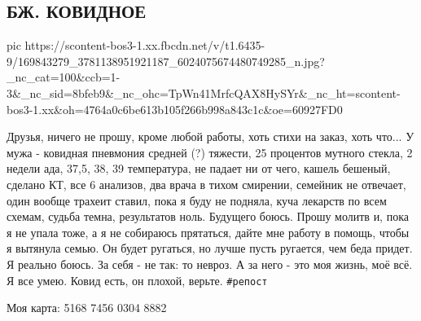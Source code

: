  
 
 
 
 

\subsection{БЖ. КОВИДНОЕ}

\ifcmt
  pic https://scontent-bos3-1.xx.fbcdn.net/v/t1.6435-9/169843279_3781138951921187_6024075674480749285_n.jpg?_nc_cat=100&ccb=1-3&_nc_sid=8bfeb9&_nc_ohc=TpWn41MrfcQAX8HySYr&_nc_ht=scontent-bos3-1.xx&oh=4764a0c6be613b105f266b998a843c1c&oe=60927FD0
\fi

Друзья, ничего не прошу, кроме любой работы, хоть стихи на заказ, хоть что... У
мужа - ковидная пневмония средней (?) тяжести, 25 процентов мутного стекла,  2
недели ада, 37,5, 38, 39 температура, не падает ни от чего, кашель бешеный,
сделано КТ, все 6 анализов, два врача в тихом смирении, семейник не отвечает,
один вообще трахеит ставил, пока я буду не подняла, куча лекарств по всем
схемам, судьба темна, результатов ноль. Будущего боюсь. Прошу молитв и, пока я
не упала тоже, а я не собираюсь прятаться, дайте мне работу в помощь, чтобы я
вытянула семью. Он будет ругаться, но лучше пусть ругается, чем беда придет. Я
реально боюсь. За себя - не так: то невроз. А за него - это моя жизнь, моё всё.
Я все умею. Ковид есть, он плохой, верьте. \verb|#репост|

Моя карта: 5168 7456 0304 8882
